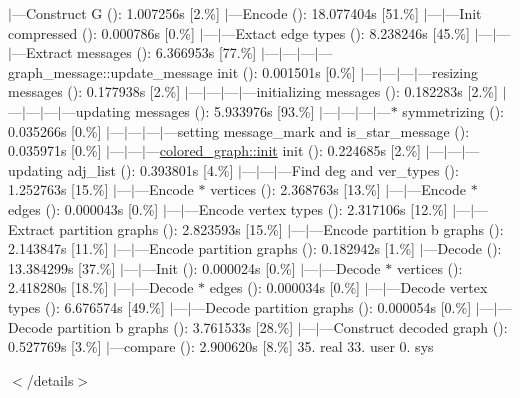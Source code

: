 $\vert$---Construct G ()\+: 1.\+007256s \mbox{[}2.\%\mbox{]} $\vert$---Encode ()\+: 18.\+077404s \mbox{[}51.\%\mbox{]} $\vert$---$\vert$---Init compressed ()\+: 0.\+000786s \mbox{[}0.\%\mbox{]} $\vert$---$\vert$---Extact edge types ()\+: 8.\+238246s \mbox{[}45.\%\mbox{]} $\vert$---$\vert$---$\vert$---Extract messages ()\+: 6.\+366953s \mbox{[}77.\%\mbox{]} $\vert$---$\vert$---$\vert$---$\vert$---graph\+\_\+message\+::update\+\_\+message init ()\+: 0.\+001501s \mbox{[}0.\%\mbox{]} $\vert$---$\vert$---$\vert$---$\vert$---resizing messages ()\+: 0.\+177938s \mbox{[}2.\%\mbox{]} $\vert$---$\vert$---$\vert$---$\vert$---initializing messages ()\+: 0.\+182283s \mbox{[}2.\%\mbox{]} $\vert$---$\vert$---$\vert$---$\vert$---updating messages ()\+: 5.\+933976s \mbox{[}93.\%\mbox{]} $\vert$---$\vert$---$\vert$---$\vert$---$\ast$ symmetrizing ()\+: 0.\+035266s \mbox{[}0.\%\mbox{]} $\vert$---$\vert$---$\vert$---$\vert$---setting message\+\_\+mark and is\+\_\+star\+\_\+message ()\+: 0.\+035971s \mbox{[}0.\%\mbox{]} $\vert$---$\vert$---$\vert$---\hyperlink{classcolored__graph_a0e867afa9f5491dfc05bed10680f0709}{colored\+\_\+graph\+::init} init ()\+: 0.\+224685s \mbox{[}2.\%\mbox{]} $\vert$---$\vert$---$\vert$---updating adj\+\_\+list ()\+: 0.\+393801s \mbox{[}4.\%\mbox{]} $\vert$---$\vert$---$\vert$---Find deg and ver\+\_\+types ()\+: 1.\+252763s \mbox{[}15.\%\mbox{]} $\vert$---$\vert$---Encode $\ast$ vertices ()\+: 2.\+368763s \mbox{[}13.\%\mbox{]} $\vert$---$\vert$---Encode $\ast$ edges ()\+: 0.\+000043s \mbox{[}0.\%\mbox{]} $\vert$---$\vert$---Encode vertex types ()\+: 2.\+317106s \mbox{[}12.\%\mbox{]} $\vert$---$\vert$---Extract partition graphs ()\+: 2.\+823593s \mbox{[}15.\%\mbox{]} $\vert$---$\vert$---Encode partition b graphs ()\+: 2.\+143847s \mbox{[}11.\%\mbox{]} $\vert$---$\vert$---Encode partition graphs ()\+: 0.\+182942s \mbox{[}1.\%\mbox{]} $\vert$---Decode ()\+: 13.\+384299s \mbox{[}37.\%\mbox{]} $\vert$---$\vert$---Init ()\+: 0.\+000024s \mbox{[}0.\%\mbox{]} $\vert$---$\vert$---Decode $\ast$ vertices ()\+: 2.\+418280s \mbox{[}18.\%\mbox{]} $\vert$---$\vert$---Decode $\ast$ edges ()\+: 0.\+000034s \mbox{[}0.\%\mbox{]} $\vert$---$\vert$---Decode vertex types ()\+: 6.\+676574s \mbox{[}49.\%\mbox{]} $\vert$---$\vert$---Decode partition graphs ()\+: 0.\+000054s \mbox{[}0.\%\mbox{]} $\vert$---$\vert$---Decode partition b graphs ()\+: 3.\+761533s \mbox{[}28.\%\mbox{]} $\vert$---$\vert$---Construct decoded graph ()\+: 0.\+527769s \mbox{[}3.\%\mbox{]} $\vert$---compare ()\+: 2.\+900620s \mbox{[}8.\%\mbox{]} 35. real 33. user 0. sys

$<$/details$>$ 